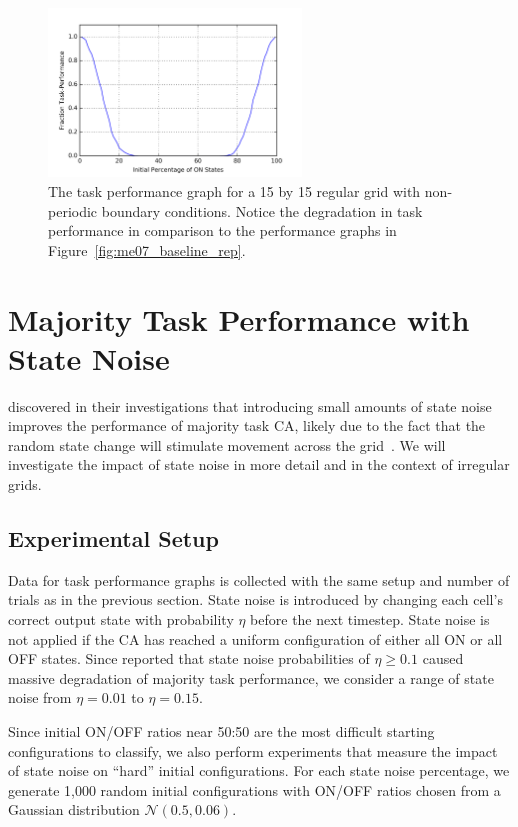 \documentclass[a4paper,11pt]{report}
\begin{document}
\begin{figure}[htp]
\centering
\includegraphics[width=0.6\textwidth]{ch5_figs/lm_baseline_reg_nontor}
\caption[Local Majority Task Performance on a Non-Periodic Regular Grid]{
  The task performance graph for a 15 by 15 regular grid with non-periodic boundary conditions. Notice the degradation in task performance in comparison to the performance graphs in Figure~\ref{fig:me07_baseline_rep}.
}
\label{fig:lm_reg_nonper}
\end{figure}

\section{Majority Task Performance with State Noise}

\citeauthor{me07} discovered in their investigations that introducing small amounts of state noise improves the performance of majority task CA, likely due to the fact that the random state change will stimulate movement across the grid~\cite{me07}. We will investigate the impact of state noise in more detail and in the context of irregular grids. 

\subsection*{Experimental Setup}

Data for task performance graphs is collected with the same setup and number of trials as in the previous section. State noise is introduced by changing each cell's correct output state with probability $\eta$ before the next timestep. State noise is not applied if the CA has reached a uniform configuration of either all ON or all OFF states. Since \citeauthor{me07} reported that state noise probabilities of $\eta \ge 0.1$ caused massive degradation of majority task performance, we consider a range of state noise from $\eta=0.01$ to $\eta=0.15$.

Since initial ON/OFF ratios near 50:50 are the most difficult starting configurations to classify, we also perform experiments that measure the impact of state noise on ``hard'' initial configurations. For each state noise percentage, we generate 1,000 random initial configurations with ON/OFF ratios chosen from a Gaussian distribution $\mathcal{N}(0.5, 0.06)$.
\end{document}
